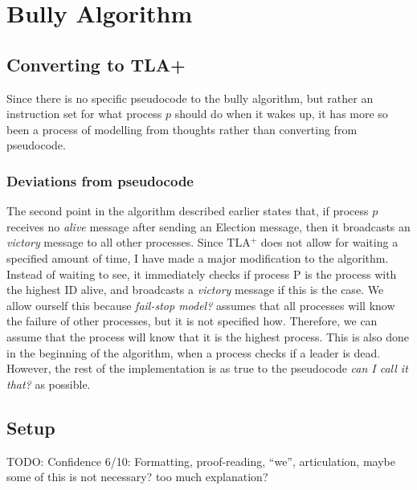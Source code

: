 \documentclass{report}
\begin{document}
\chapter{Bully Algorithm}

\section{Converting to TLA+}
Since there is no specific pseudocode to the bully algorithm, but rather an instruction set for what process $p$ should do when it wakes up, it has more so been a process of modelling from thoughts rather than converting from pseudocode.

\subsection{Deviations from pseudocode}
The second point in the algorithm described earlier states that, if process $p$ receives no \textit{alive} message after sending an Election message, then it broadcasts an \textit{victory} message to all other processes. Since TLA$^{+}$ does not allow for waiting a specified amount of time, I have made a major modification to the algorithm. Instead of waiting to see, it immediately checks if process P is the process with the highest ID alive, and broadcasts a \textit{victory} message if this is the case. We allow ourself this because \textit{fail-stop model?} assumes that all processes will know the failure of other processes, but it is not specified how. Therefore, we can assume that the process will know that it is the highest process. This is also done in the beginning of the algorithm, when a process checks if a leader is dead. However, the rest of the implementation is as true to the pseudocode \textit{can I call it that?} as possible.

\section{Setup}

\begin{callout}
TODO: Confidence 6/10: Formatting, proof-reading, ``we'', articulation, maybe some of this is not necessary? too much explanation?
\end{callout}
\end{document}
